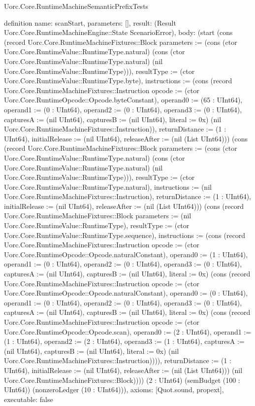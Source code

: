 \begin{lexlean}{Uorc.Core.RuntimeMachineSemanticPrefixTests}
\begin{semanticmodule}
definition{
  name: scanStart,
  parameters: [],
  result: (Result Uorc.Core.RuntimeMachineEngine::State ScenarioError),
  body: (start (cons (record Uorc.Core.RuntimeMachineFixtures::Block {parameters := (cons (ctor Uorc.Core.RuntimeValue::RuntimeType.natural) (cons (ctor Uorc.Core.RuntimeValue::RuntimeType.natural) (nil Uorc.Core.RuntimeValue::RuntimeType))), resultType := (ctor Uorc.Core.RuntimeValue::RuntimeType.byte), instructions := (cons (record Uorc.Core.RuntimeMachineFixtures::Instruction {opcode := (ctor Uorc.Core.RuntimeOpcode::Opcode.byteConstant), operand0 := (65 : UInt64), operand1 := (0 : UInt64), operand2 := (0 : UInt64), operand3 := (0 : UInt64), capturesA := (nil UInt64), capturesB := (nil UInt64), literal := 0x}) (nil Uorc.Core.RuntimeMachineFixtures::Instruction)), returnDistance := (1 : UInt64), initialRelease := (nil UInt64), releaseAfter := (nil (List UInt64))}) (cons (record Uorc.Core.RuntimeMachineFixtures::Block {parameters := (cons (ctor Uorc.Core.RuntimeValue::RuntimeType.natural) (cons (ctor Uorc.Core.RuntimeValue::RuntimeType.natural) (nil Uorc.Core.RuntimeValue::RuntimeType))), resultType := (ctor Uorc.Core.RuntimeValue::RuntimeType.natural), instructions := (nil Uorc.Core.RuntimeMachineFixtures::Instruction), returnDistance := (1 : UInt64), initialRelease := (nil UInt64), releaseAfter := (nil (List UInt64))}) (cons (record Uorc.Core.RuntimeMachineFixtures::Block {parameters := (nil Uorc.Core.RuntimeValue::RuntimeType), resultType := (ctor Uorc.Core.RuntimeValue::RuntimeType.sequence), instructions := (cons (record Uorc.Core.RuntimeMachineFixtures::Instruction {opcode := (ctor Uorc.Core.RuntimeOpcode::Opcode.naturalConstant), operand0 := (1 : UInt64), operand1 := (0 : UInt64), operand2 := (0 : UInt64), operand3 := (0 : UInt64), capturesA := (nil UInt64), capturesB := (nil UInt64), literal := 0x}) (cons (record Uorc.Core.RuntimeMachineFixtures::Instruction {opcode := (ctor Uorc.Core.RuntimeOpcode::Opcode.naturalConstant), operand0 := (0 : UInt64), operand1 := (0 : UInt64), operand2 := (0 : UInt64), operand3 := (0 : UInt64), capturesA := (nil UInt64), capturesB := (nil UInt64), literal := 0x}) (cons (record Uorc.Core.RuntimeMachineFixtures::Instruction {opcode := (ctor Uorc.Core.RuntimeOpcode::Opcode.scan), operand0 := (2 : UInt64), operand1 := (1 : UInt64), operand2 := (2 : UInt64), operand3 := (1 : UInt64), capturesA := (nil UInt64), capturesB := (nil UInt64), literal := 0x}) (nil Uorc.Core.RuntimeMachineFixtures::Instruction)))), returnDistance := (1 : UInt64), initialRelease := (nil UInt64), releaseAfter := (nil (List UInt64))}) (nil Uorc.Core.RuntimeMachineFixtures::Block)))) (2 : UInt64) (semBudget (100 : UInt64)) (nonzeroLedger (10 : UInt64))),
  axioms: [Quot.sound, propext],
  executable: false
}


\end{semanticmodule}
\end{lexlean}
